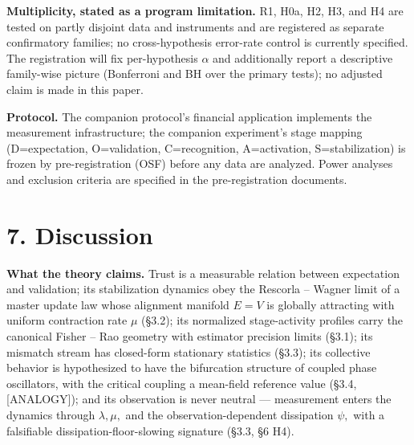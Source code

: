 \documentclass[11pt,twocolumn]{article}
\theoremstyle{gttdef}
\theoremstyle{gttplain}
\begin{document}
\textbf{Multiplicity, stated as a program limitation.} R1, H0a, H2, H3, and H4 are tested on partly disjoint data and instruments and are registered as separate confirmatory families; no cross-hypothesis error-rate control is currently specified. The registration will fix per-hypothesis $\alpha$ and additionally report a descriptive family-wise picture (Bonferroni and BH over the primary tests); no adjusted claim is made in this paper.

\textbf{Protocol.} The companion protocol's financial application implements the measurement infrastructure; the companion experiment's stage mapping (D=expectation, O=validation, C=recognition, A=activation, S=stabilization) is frozen by pre-registration (OSF) before any data are analyzed. Power analyses and exclusion criteria are specified in the pre-registration documents.

\section*{7. Discussion}

\textbf{What the theory claims.} Trust is a measurable relation between expectation and validation; its stabilization dynamics obey the Rescorla -- Wagner limit of a master update law whose alignment manifold $E = V$ is globally attracting with uniform contraction rate $\mu$ (\S{}3.2); its normalized stage-activity profiles carry the canonical Fisher -- Rao geometry with estimator precision limits (\S{}3.1); its mismatch stream has closed-form stationary statistics (\S{}3.3); its collective behavior is hypothesized to have the bifurcation structure of coupled phase oscillators, with the critical coupling a mean-field reference value (\S{}3.4, [ANALOGY]); and its observation is never neutral --- measurement enters the dynamics through $\lambda, \mu,$ and the observation-dependent dissipation $\psi,$ with a falsifiable dissipation-floor-slowing signature (\S{}3.3, \S{}6 H4).
\end{document}
